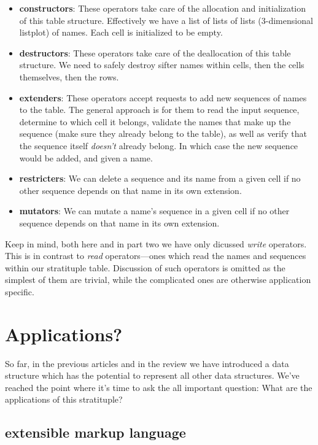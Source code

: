 \documentclass[twoside]{article}
\begin{document}
\begin{itemize}
\item {\bf constructors}: These operators take care of the allocation and initialization of this table structure.
      Effectively we have a list of lists of lists (3-dimensional listplot) of names. Each cell is initialized to be empty.
\item {\bf destructors}: These operators take care of the deallocation of this table structure. We need to safely destroy
      sifter names within cells, then the cells themselves, then the rows.
\item {\bf extenders}: These operators accept requests to add new sequences of names to the table. The general approach
      is for them to read the input sequence, determine to which cell it belongs, validate the names that make up the
      sequence (make sure they already belong to the table), as well as verify that the sequence itself \emph{doesn't}
      already belong. In which case the new sequence would be added, and given a name.
\item {\bf restricters}: We can delete a sequence and its name from a given cell if no other sequence depends on that
      name in its own extension.
\item {\bf mutators}:  We can mutate a name's sequence in a given cell if no other sequence depends on that name in
      its own extension.
\end{itemize}

Keep in mind, both here and in part two we have only dicussed \emph{write} operators. This is in contrast
to \emph{read} operators---ones which read the names and sequences within our stratituple table. Discussion
of such operators is omitted as the simplest of them are trivial, while the complicated ones are otherwise
application specific.

\section*{Applications?}

So far, in the previous articles and in the review we have introduced a data structure which has the
potential to represent all other data structures. We've reached the point where it's time to ask the
all important question: What are the applications of this stratituple?

\subsection*{extensible markup language}
\end{document}
